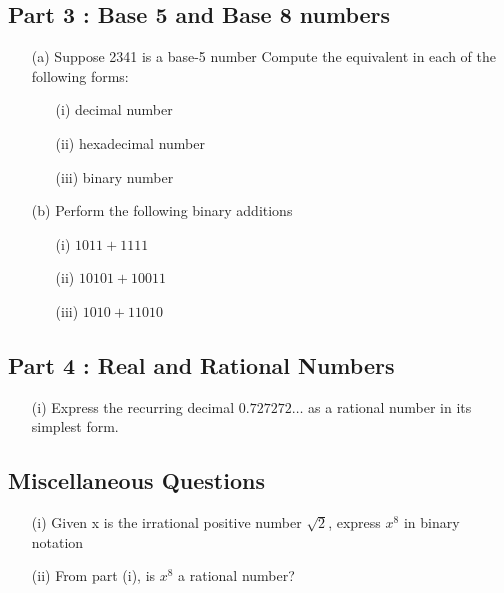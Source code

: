 \documentclass[12pt]{article}
\begin{document}
\subsection*{Part 3 : Base 5 and Base 8 numbers}
\begin{itemize}
\item[(a)] Suppose 2341 is a base-5 number
Compute the equivalent in each of the following forms:
\begin{itemize}
\item[(i)] decimal number
\item[(ii)] hexadecimal number
\item[(iii)] binary number
\end{itemize}
\item[(b)] Perform the following binary additions
\begin{itemize}
\item[(i)] $1011+ 1111$
\item[(ii)] $10101  + 10011$
\item[(iii)] $1010 + 11010$
\end{itemize}
\end{itemize}

\subsection*{Part 4 : Real and Rational Numbers}
\begin{itemize}
\item[(i)] Express the recurring decimal $0.727272\ldots$ as a rational number in its simplest form.
\end{itemize}
\subsection*{Miscellaneous Questions}
\begin{itemize}
\item[(i)] Given x is the irrational positive number $\sqrt{2}$, express $x^8$ in binary notation\\
\item[(ii)] From part (i), is $x^8$ a rational number?
\end{itemize}
\newpage
\end{document}
